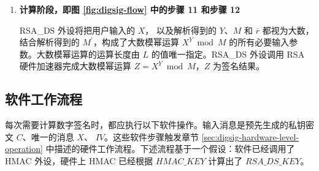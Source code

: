 \documentclass[main\_\_CN.tex]{subfiles}
\begin{document}
\begin{enumerate}
    \item {\bfseries 计算阶段，即图 \ref{fig:digsig-flow} 中的步骤 11 和步骤 12}
    
        RSA\_DS 外设将把用户输入的 \begin{math}X\end{math}，
        以及解析得到的 \begin{math}Y\end{math}、\begin{math}M\end{math} 和 \begin{math}\overline{r}\end{math} 都视为大数，结合解析得到的 \begin{math}M^{\prime}\end{math}，构成了大数模幂运算 \begin{math} X^{Y} \bmod M\end{math} 的所有必要输入参数。大数模幂运算的运算长度由 \begin{math}L\end{math} 的值唯一指定。RSA\_DS 外设调用 RSA 硬件加速器完成大数模幂运算 \begin{math}Z = X^{Y} \bmod M\end{math}，\begin{math}Z\end{math} 为签名结果。

\end{enumerate}


\subsection{软件工作流程}

每次需要计算数字签名时，都应执行以下软件操作。输入消息是预先生成的私钥密文 \begin{math}C\end{math}、唯一的消息 \begin{math}X\end{math}、 \begin{math}IV\end{math}。这些软件步骤触发章节 \ref{sec:digsig-hardware-level-operation} 中描述的硬件工作流程。下述流程基于一个假设：软件已经调用了 HMAC 外设，硬件上 HMAC 已经根据 \begin{math}HMAC\_KEY\end{math} 计算出了 \begin{math}RSA\_DS\_KEY\end{math}。
\end{document}
